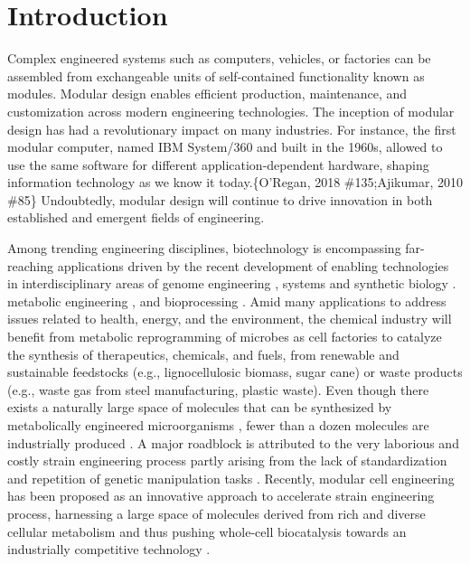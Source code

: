 

\section{Introduction}

Complex engineered systems such as computers, vehicles, or factories can be assembled from exchangeable units of self-contained functionality known as modules.
Modular design enables efficient production, maintenance, and customization across modern engineering technologies.
The inception of modular design has had a revolutionary impact on many industries.
For instance, the first modular computer, named IBM System/360 and built in the 1960s, allowed to use the same software for different application-dependent hardware, shaping information technology as we know it today.\{O'Regan, 2018 \#135;Ajikumar, 2010 \#85\} Undoubtedly, modular design will continue to drive innovation in both established and emergent fields of engineering.

Among trending engineering disciplines, biotechnology is encompassing far-reaching applications driven by the recent development of enabling technologies in interdisciplinary areas of genome engineering \citep{barrangou2016}, systems and synthetic biology \citep{kahl2013}.
metabolic engineering \citep{nielsen2016b}, and bioprocessing \citep{cramer2011, olson2012}.
Amid many applications to address issues related to health, energy, and the environment, the chemical industry will benefit from metabolic reprogramming of microbes as cell factories to catalyze the synthesis of therapeutics, chemicals, and fuels, from renewable and sustainable feedstocks (e.g., lignocellulosic biomass, sugar cane) or waste products (e.g., waste gas from steel manufacturing, plastic waste).
Even though there exists a naturally large space of molecules that can be synthesized by metabolically engineered microorganisms \citep{lee2019}, fewer than a dozen molecules are industrially produced \citep{nielsen2016b}.
A major roadblock is attributed to the very laborious and costly strain engineering process partly arising from the lack of standardization and repetition of genetic manipulation tasks \citep{king2017, winkler2015}.
Recently, modular cell engineering has been proposed as an innovative approach to accelerate strain engineering process, harnessing a large space of molecules derived from rich and diverse cellular metabolism and thus pushing whole-cell biocatalysis towards an industrially competitive technology \citep{trinh2016}.

